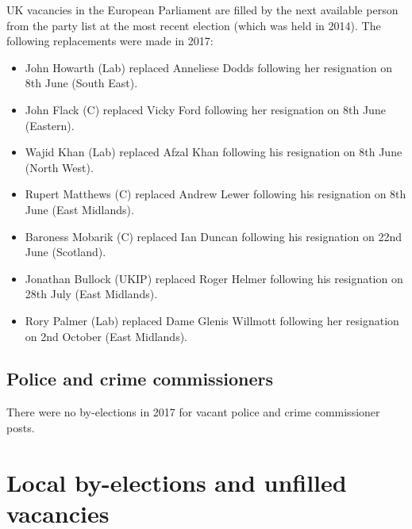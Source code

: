 \documentclass[a4paper,openany]{book}
\begin{document}
UK vacancies in the European Parliament are filled by the next available person from the party list at the most recent election (which was held in 2014). 
The following replacements were made in 2017:
\begin{itemize}
\item John Howarth (Lab) replaced Anneliese Dodds following her resignation on 8th June (South East).
\item John Flack (C) replaced Vicky Ford following her resignation on 8th June (Eastern).
\item Wajid Khan (Lab) replaced Afzal Khan following his resignation on 8th June (North West).
\item Rupert Matthews (C) replaced Andrew Lewer following his resignation on 8th June (East Midlands).
\item Baroness Mobarik (C) replaced Ian Duncan following his resignation on 22nd June (Scotland).
\item Jonathan Bullock (UKIP) replaced Roger Helmer following his resignation on 28th July (East Midlands).
\item Rory Palmer (Lab) replaced Dame Glenis Willmott following her resignation on 2nd October (East Midlands).
\end{itemize}

\section{Police and crime commissioners}

There were no by-elections in 2017 for vacant police and crime commissioner posts.

\chapter{Local by-elections and unfilled vacancies}
\end{document}
